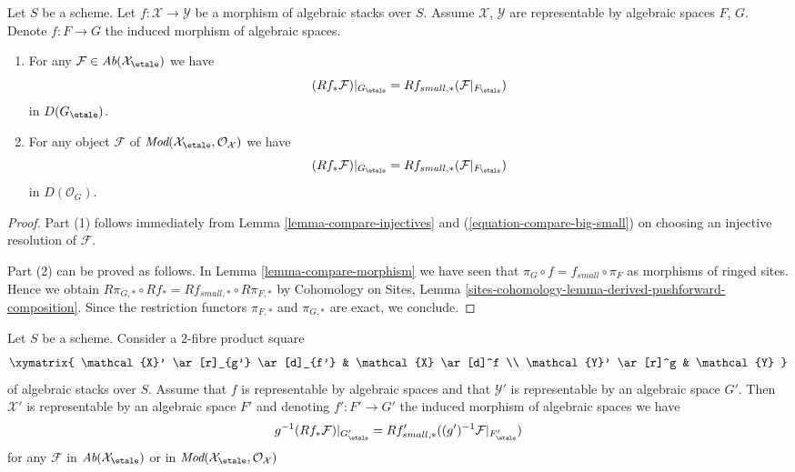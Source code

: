 \begin{lemma}
\label{lemma-compare-morphism-cohomology}
Let $S$ be a scheme. Let $f : \mathcal{X} \to \mathcal{Y}$ be a morphism
of algebraic stacks over $S$. Assume $\mathcal{X}$, $\mathcal{Y}$ are
representable by algebraic spaces $F$, $G$. Denote $f : F \to G$ the
induced morphism of algebraic spaces.
\begin{enumerate}
\item For any $\mathcal{F} \in \textit{Ab}(\mathcal{X}_\etale)$
we have
$$
(Rf_*\mathcal{F})|_{G_\etale} =
Rf_{small, *}(\mathcal{F}|_{F_\etale})
$$
in $D(G_\etale)$.
\item For any object $\mathcal{F}$ of
$\textit{Mod}(\mathcal{X}_\etale, \mathcal{O}_\mathcal{X})$
we have
$$
(Rf_*\mathcal{F})|_{G_\etale} =
Rf_{small, *}(\mathcal{F}|_{F_\etale})
$$
in $D(\mathcal{O}_G)$.
\end{enumerate}
\end{lemma}

\begin{proof}
Part (1) follows immediately from
Lemma \ref{lemma-compare-injectives}
and (\ref{equation-compare-big-small})
on choosing an injective resolution of $\mathcal{F}$.

\medskip\noindent
Part (2) can be proved as follows. In Lemma \ref{lemma-compare-morphism}
we have seen that $\pi_G \circ f = f_{small} \circ \pi_F$ as morphisms
of ringed sites. Hence we obtain
$R\pi_{G, *} \circ Rf_* = Rf_{small, *} \circ R\pi_{F, *}$
by Cohomology on Sites, Lemma
\ref{sites-cohomology-lemma-derived-pushforward-composition}.
Since the restriction functors $\pi_{F, *}$ and $\pi_{G, *}$
are exact, we conclude.
\end{proof}

\begin{lemma}
\label{lemma-compare-representable-morphism-cohomology}
Let $S$ be a scheme. Consider a $2$-fibre product square
$$
\xymatrix{
\mathcal{X}' \ar[r]_{g'} \ar[d]_{f'} & \mathcal{X} \ar[d]^f \\
\mathcal{Y}' \ar[r]^g & \mathcal{Y}
}
$$
of algebraic stacks over $S$. Assume that $f$ is representable by algebraic
spaces and that $\mathcal{Y}'$ is representable by an algebraic space $G'$.
Then $\mathcal{X}'$ is representable by an algebraic space $F'$ and
denoting $f' : F' \to G'$ the induced morphism of algebraic spaces
we have
$$
g^{-1}(Rf_*\mathcal{F})|_{G'_\etale} =
Rf'_{small, *}((g')^{-1}\mathcal{F}|_{F'_\etale})
$$
for any $\mathcal{F}$ in $\textit{Ab}(\mathcal{X}_\etale)$
or in
$\textit{Mod}(\mathcal{X}_\etale, \mathcal{O}_\mathcal{X})$
\end{lemma}

